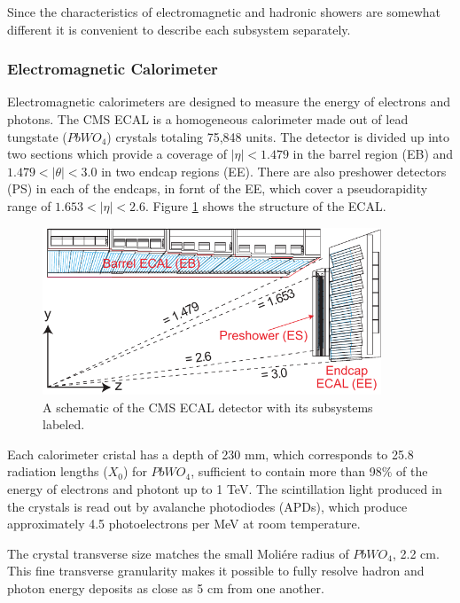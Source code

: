 Since the characteristics of electromagnetic and hadronic showers are somewhat different it is convenient to describe each subsystem separately.

 \subsubsection{Electromagnetic Calorimeter}

 Electromagnetic calorimeters are designed to measure the energy of electrons and photons. The CMS ECAL\cite{CERN-LHCC-97-033} is a homogeneous calorimeter made out of lead tungstate ($PbWO_{4}$) crystals totaling 75,848 units. The detector is divided up into two sections which provide a coverage of $|\eta| < 1.479$ in the barrel region (EB) and $1.479 < |\theta| < 3.0$ in two endcap regions (EE). There are also preshower detectors (PS) in each of the endcaps, in fornt of the EE, which cover a pseudorapidity range of $1.653 < |\eta| < 2.6$. Figure \ref{fig:cmsecal} shows the structure of the ECAL.

    \begin{figure}[H]
 	\centering
 	\includegraphics[width=0.9\textwidth]{figures/ECAL_transverse_Section.pdf}
 	\singlespace
 	\caption{A schematic of the CMS ECAL detector with its subsystems labeled.}
 	\label{fig:cmsecal}
	 \end{figure}

Each calorimeter cristal has a depth of 230 mm, which corresponds to 25.8 radiation lengths ($X_{0}$) for $PbWO_{4}$, sufficient to contain more than 98$\%$ of the energy of electrons and photont up to 1 TeV. The scintillation light produced in the crystals is read out by avalanche photodiodes (APDs), which produce approximately 4.5 photoelectrons per MeV at room temperature. 

The crystal transverse size matches the small Moliére radius of $PbWO_{4}$, 2.2 cm. This fine transverse granularity makes it possible to fully resolve hadron and photon energy deposits as close as 5 cm from one another.

